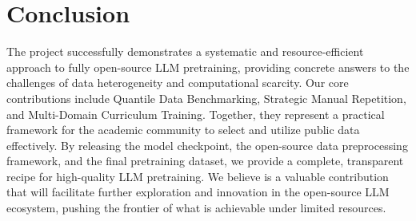 \section{Conclusion}

The \sys project successfully demonstrates a systematic and resource-efficient approach to fully open-source LLM pretraining, providing concrete answers to the challenges of data heterogeneity and computational scarcity. Our core contributions include Quantile Data Benchmarking, Strategic Manual Repetition, and Multi-Domain Curriculum Training. Together, they represent a practical framework for the academic community to select and utilize public data effectively. By releasing the model checkpoint, the open-source data preprocessing framework, and the final pretraining dataset, we provide a complete, transparent recipe for high-quality LLM pretraining. We believe \sys is a valuable contribution that will facilitate further exploration and innovation in the open-source LLM ecosystem, pushing the frontier of what is achievable under limited resources.

